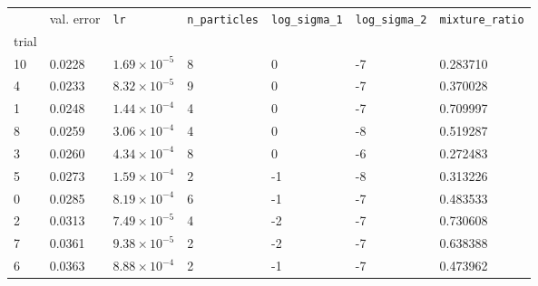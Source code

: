 \begin{tabular}{lp{2.3cm}p{2.3cm}p{2.3cm}p{2.3cm}p{2.3cm}p{2.3cm}}
\toprule
{} &  val. error &         \texttt{lr} &  \texttt{n\_particles} &  \texttt{log\_sigma\_1} &  \texttt{log\_sigma\_2} &  \texttt{mixture\_ratio} \\
trial &             &                     &                        &                         &                         &                          \\
\midrule
10    &      0.0228 & $1.69\times10^{-5}$ &                      8 &                       0 &                      -7 &                 0.283710 \\
4     &      0.0233 & $8.32\times10^{-5}$ &                      9 &                       0 &                      -7 &                 0.370028 \\
1     &      0.0248 & $1.44\times10^{-4}$ &                      4 &                       0 &                      -7 &                 0.709997 \\
8     &      0.0259 & $3.06\times10^{-4}$ &                      4 &                       0 &                      -8 &                 0.519287 \\
3     &      0.0260 & $4.34\times10^{-4}$ &                      8 &                       0 &                      -6 &                 0.272483 \\
5     &      0.0273 & $1.59\times10^{-4}$ &                      2 &                      -1 &                      -8 &                 0.313226 \\
0     &      0.0285 & $8.19\times10^{-4}$ &                      6 &                      -1 &                      -7 &                 0.483533 \\
2     &      0.0313 & $7.49\times10^{-5}$ &                      4 &                      -2 &                      -7 &                 0.730608 \\
7     &      0.0361 & $9.38\times10^{-5}$ &                      2 &                      -2 &                      -7 &                 0.638388 \\
6     &      0.0363 & $8.88\times10^{-4}$ &                      2 &                      -1 &                      -7 &                 0.473962 \\
\bottomrule
\end{tabular}
